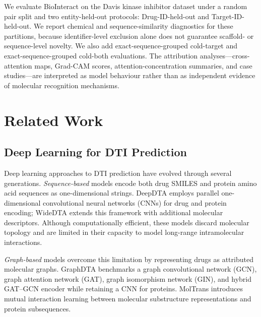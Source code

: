 \documentclass[fleqn,10pt]{wlscirep}
\begin{document}
We evaluate BioInteract on the Davis kinase inhibitor
dataset\cite{davis2011comprehensive} under a random pair split and two
entity-held-out protocols: Drug-ID-held-out and Target-ID-held-out. We report
chemical and sequence-similarity
diagnostics for these partitions, because identifier-level exclusion alone does
not guarantee scaffold- or sequence-level novelty.  We also add
exact-sequence-grouped cold-target and exact-sequence-grouped cold-both
evaluations.  The attribution
analyses---cross-attention maps, Grad-CAM scores, attention-concentration
summaries, and case studies---are interpreted as model behaviour rather than as
independent evidence of molecular recognition mechanisms.

\section{Related Work}
\label{sec:related}

\subsection{Deep Learning for DTI Prediction}

Deep learning approaches to DTI prediction have evolved through several
generations.\cite{wen2017deep}  \emph{Sequence-based} models encode both
drug SMILES and protein amino acid sequences as one-dimensional strings.
DeepDTA\cite{ozturk2018deepdta} employs parallel one-dimensional convolutional
neural networks (CNNs) for drug and
protein encoding; WideDTA\cite{ozturk2019widedta} extends this framework
with additional molecular descriptors.  Although computationally efficient, these
models discard molecular topology and are limited in their capacity to model
long-range intramolecular interactions.

\emph{Graph-based} models overcome this limitation by representing drugs as
attributed molecular graphs.  GraphDTA\cite{nguyen2021graphdta} benchmarks a
graph convolutional network (GCN), graph attention network (GAT), graph
isomorphism network (GIN), and hybrid GAT--GCN encoder while retaining a CNN
for proteins.  MolTrans\cite{huang2021moltrans} introduces mutual
interaction learning between molecular substructure representations and protein
subsequences.
\end{document}
